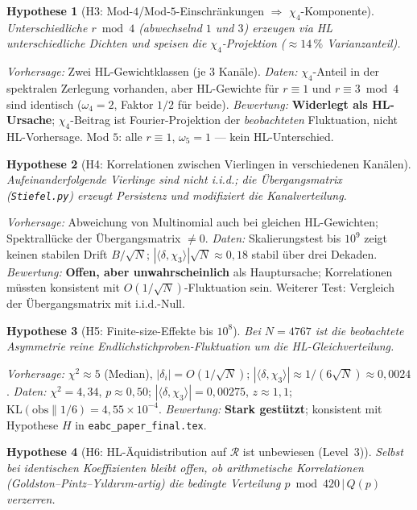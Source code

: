\documentclass[11pt,a4paper]{article}
\newtheorem{hypothesis}{Hypothese}
\newcommand{\R}{\mathcal{R}}
\begin{document}
\begin{hypothesis}[H3: Mod-$4$/Mod-$5$-Einschränkungen $\Rightarrow$ $\chi_4$-Komponente]
\label{hyp:H3}
Unterschiedliche $r\bmod 4$ (abwechselnd $1$ und $3$) erzeugen via HL
unterschiedliche Dichten und speisen die $\chi_4$-Projektion
($\approx 14\,\%$ Varianzanteil).
\end{hypothesis}

\emph{Vorhersage:} Zwei HL-Gewichtklassen (je $3$ Kanäle).
\emph{Daten:} $\chi_4$-Anteil in der spektralen Zerlegung vorhanden,
aber HL-Gewichte für $r\equiv 1$ und $r\equiv 3\bmod 4$ sind identisch
($\omega_4=2$, Faktor $1/2$ für beide).
\emph{Bewertung:} \textbf{Widerlegt als HL-Ursache}; $\chi_4$-Beitrag ist
Fourier-Projektion der \emph{beobachteten} Fluktuation, nicht HL-Vorhersage.
Mod $5$: alle $r\equiv 1$, $\omega_5=1$ --- kein HL-Unterschied.

\begin{hypothesis}[H4: Korrelationen zwischen Vierlingen in verschiedenen Kanälen]
\label{hyp:H4}
Aufeinanderfolgende Vierlinge sind nicht i.i.d.; die Übergangsmatrix
(\texttt{Stiefel.py}) erzeugt Persistenz und modifiziert die Kanalverteilung.
\end{hypothesis}

\emph{Vorhersage:} Abweichung von Multinomial auch bei gleichen HL-Gewichten;
Spektrallücke der Übergangsmatrix $\neq 0$.
\emph{Daten:} Skalierungstest bis $10^9$ zeigt keinen stabilen Drift
$B/\sqrt{N}$; $|\langle\delta,\chi_3\rangle|\sqrt{N}\approx 0{,}18$
stabil über drei Dekaden.
\emph{Bewertung:} \textbf{Offen, aber unwahrscheinlich} als Hauptursache;
Korrelationen müssten konsistent mit $O(1/\sqrt{N})$-Fluktuation sein.
Weiterer Test: Vergleich der Übergangsmatrix mit i.i.d.-Null.

\begin{hypothesis}[H5: Finite-size-Effekte bis $10^8$]
\label{hyp:H5}
Bei $N=4767$ ist die beobachtete Asymmetrie reine Endlichstichproben-Fluktuation
um die HL-Gleichverteilung.
\end{hypothesis}

\emph{Vorhersage:} $\chi^2\approx 5$ (Median), $|\delta_i|=O(1/\sqrt{N})$;
$|\langle\delta,\chi_3\rangle|\approx 1/(6\sqrt{N})\approx 0{,}0024$.
\emph{Daten:} $\chi^2=4{,}34$, $p\approx 0{,}50$;
$|\langle\delta,\chi_3\rangle|=0{,}00275$, $z\approx 1{,}1$;
$\mathrm{KL}(\text{obs}\|1/6)=4{,}55\times 10^{-4}$.
\emph{Bewertung:} \textbf{Stark gestützt}; konsistent mit Hypothese $H$
in \texttt{eabc\_paper\_final.tex}.

\begin{hypothesis}[H6: HL-Äquidistribution auf $\R$ ist unbewiesen (Level~3)]
\label{hyp:H6}
Selbst bei identischen Koeffizienten bleibt offen, ob arithmetische
Korrelationen (Goldston--Pintz--Yıldırım-artig) die bedingte Verteilung
$p\bmod 420\,|\,Q(p)$ verzerren.
\end{hypothesis}
\end{document}

